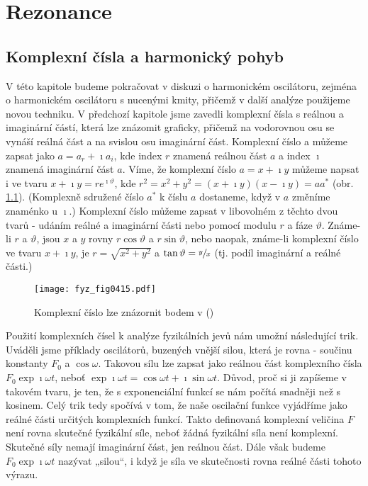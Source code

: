 \setchaptertoc
\chapter{Rezonance}\label{fyz:IchapXXIII}
  \section{Komplexní čísla a harmonický pohyb}\label{fyz:IchapXXIIIsecI}
    V této kapitole budeme pokračovat v diskuzi o harmonickém oscilátoru, zejména o harmonickém
    oscilátoru s nucenými kmity, přičemž v další analýze použijeme novou techniku. V předchozí
    kapitole jsme zavedli komplexní čísla s reálnou a imaginární částí, která lze znázomit graficky,
    přičemž na vodorovnou osu se vynáší reálná část a na svislou osu imaginární část. Komplexní
    číslo a můžeme zapsat jako \(a= a_r + \imath a_i\), kde index \(r\) znamená reálnou část \(a\) a
    index \(\imath\) znamená imaginární část \(a\). Víme, že komplexní číslo \(a = x + \imath y\)
    můžeme napsat i ve tvaru \(x + \imath y = r e^{\imath\vartheta}\), kde \(r^2 = x^2 + y^2 = (x +
    \imath y)(x - \imath y) = aa^*\) (obr. \ref{fyz:fig0415}). (Komplexně sdružené číslo \(a^*\) k
    číslu \(a\) dostaneme, když v \(a\) změníme znaménko u \(\imath\).) Komplexní číslo můžeme
    zapsat v libovolném z těchto dvou tvarů - udáním reálné a imaginární části nebo pomocí modulu
    \(r\) a fáze \(\vartheta\). Známe-li \(r\) a \(\vartheta\), jsou \(x\) a \(y\) rovny
    \(r\cos\vartheta\) a \(r\sin\vartheta\), nebo naopak, známe-li komplexní číslo ve tvaru \(x +
    \imath y\), je \(r= \sqrt{x^2 + y^2}\) a \(\tan\vartheta=\sfrac{y}{x}\) (tj. podíl imaginární a
    reálné části.)

    \begin{figure}[ht!] %
      \centering
      \texttt{[image: fyz\_fig0415.pdf]}
      \caption{Komplexní číslo lze znázornit bodem v 
               (\cite[s.~309]{Feynman01})}
      \label{fyz:fig0415}
    \end{figure}

    Použití komplexních čísel k analýze fyzikálních jevů nám umožní následující trik. Uváděli jsme
    příklady oscilátorů, buzených vnější silou, která je rovna - součinu konstanty \(F_0\) a
    \(\cos\omega \). Takovou sílu lze zapsat jako reálnou část komplexního čísla
    \(F_0\exp{\imath\omega t}\), neboť \(\exp{\imath\omega t} = \cos\omega t + \imath\sin\omega t\).
    Důvod, proč si ji zapíšeme v takovém tvaru, je ten, že s exponenciální funkcí se nám počítá
    snadněji než s kosinem. Celý trik tedy spočívá v tom, že naše oscilační funkce vyjádříme jako
    reálné části určitých komplexních funkcí. Takto definovaná komplexní veličina \(F\) není rovna
    skutečné fyzikální síle, neboť žádná fyzikální síla není komplexní. Skutečné síly nemají
    imaginární část, jen reálnou část. Dále však budeme \(F_0\exp{\imath\omega t}\) nazývat „silou“,
    i když je síla ve skutečnosti rovna reálné části tohoto výrazu.

